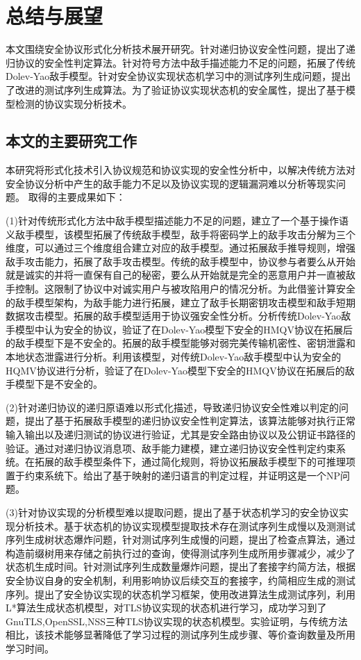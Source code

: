 \chapter{总结与展望}

本文围绕安全协议形式化分析技术展开研究。针对递归协议安全性问题，提出了递归协议的安全性判定算法。针对符号方法中敌手描述能力不足的问题，拓展了传统Dolev-Yao敌手模型。针对安全协议实现状态机学习中的测试序列生成问题，提出了改进的测试序列生成算法。为了验证协议实现状态机的安全属性，提出了基于模型检测的协议实现分析技术。

\section{本文的主要研究工作}
本研究将形式化技术引入协议规范和协议实现的安全性分析中，以解决传统方法对安全协议分析中产生的敌手能力不足以及协议实现的逻辑漏洞难以分析等现实问题。
取得的主要成果如下：

(1)针对传统形式化方法中敌手模型描述能力不足的问题，建立了一个基于操作语义敌手模型，该模型拓展了传统敌手模型，敌手将密码学上的敌手攻击分解为三个维度，可以通过三个维度组合建立对应的敌手模型。通过拓展敌手推导规则，增强敌手攻击能力，拓展了敌手攻击模型。传统的敌手模型中，协议参与者要么从开始就是诚实的并将一直保有自己的秘密，要么从开始就是完全的恶意用户并一直被敌手控制。这限制了协议中对诚实用户与被攻陷用户的情况分析。为此借鉴计算安全的敌手模型架构，为敌手能力进行拓展，建立了敌手长期密钥攻击模型和敌手短期数据攻击模型。拓展的敌手模型适用于协议强安全性分析。分析传统Dolev-Yao敌手模型中认为安全的协议，验证了在Dolev-Yao模型下安全的HMQV协议在拓展后的敌手模型下是不安全的。拓展的敌手模型能够对弱完美传输机密性、密钥泄露和本地状态泄露进行分析。利用该模型，对传统Dolev-Yao敌手模型中认为安全的HQMV协议进行分析，验证了在Dolev-Yao模型下安全的HMQV协议在拓展后的敌手模型下是不安全的。

(2)针对递归协议的递归原语难以形式化描述，导致递归协议安全性难以判定的问题，提出了基于拓展敌手模型的递归协议安全性判定算法，该算法能够对执行正常输入输出以及递归测试的协议进行验证，尤其是安全路由协议以及公钥证书路径的验证。通过对递归协议消息项、敌手能力建模，建立递归协议安全性判定约束系统。在拓展的敌手模型条件下，通过简化规则，将协议拓展敌手模型下的可推理项置于约束系统下。给出了基于映射的递归语言的判定过程，并证明这是一个NP问题。

(3)针对协议实现的分析模型难以提取问题，提出了基于状态机学习的安全协议实现分析技术。基于状态机的协议实现模型提取技术存在测试序列生成慢以及测测试序列生成树状态爆炸问题，针对测试序列生成慢的问题，提出了检查点算法，通过构造前缀树用来存储之前执行过的查询，使得测试序列生成所用步骤减少，减少了状态机生成时间。针对测试序列生成数量爆炸问题，提出了套接字约简方法，根据安全协议自身的安全机制，利用影响协议后续交互的套接字，约简相应生成的测试序列。提出了安全协议实现的状态机学习框架，使用改进算法生成测试序列，利用L*算法生成状态机模型，对TLS协议实现的状态机进行学习，成功学习到了GnuTLS,OpenSSL,NSS三种TLS协议实现的状态机模型。实验证明，与传统方法相比，该技术能够显著降低了学习过程的测试序列生成步骤、等价查询数量及所用学习时间。


